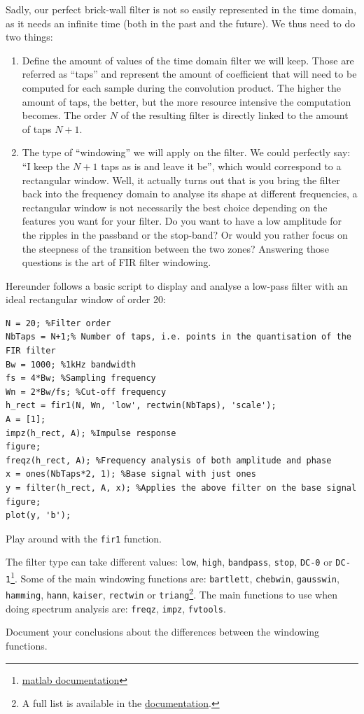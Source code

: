 \documentclass{../template/labo}
\begin{document}
Sadly, our perfect brick-wall filter is not so easily represented in the time domain, as it needs an infinite time (both in the past and the future).
We thus need to do two things:
\begin{enumerate}
  \item Define the amount of values of the time domain filter we will keep. Those are referred as ``taps'' and represent the amount of coefficient that will need to be computed for each sample during the convolution product. The higher the amount of taps, the better, but the more resource intensive the computation becomes.
  The order $N$ of the resulting filter is directly linked to the amount of taps $N+1$.
  \item The type of ``windowing'' we will apply on the filter.
  We could perfectly say: ``I keep the $N+1$ taps as is and leave it be'', which would correspond to a rectangular window.
  Well, it actually turns out that is you bring the filter back into the frequency domain to analyse its shape at different frequencies, a rectangular window is not necessarily the best choice depending on the features you want for your filter.
  Do you want to have a low amplitude for the ripples in the passband or the stop-band? Or would you rather focus on the steepness of the transition between the two zones?
  Answering those questions is the art of FIR filter windowing.
\end{enumerate}


Hereunder follows a basic script to display and analyse a low-pass filter with an ideal rectangular window of order 20:
\begin{verbatim}
N = 20; %Filter order
NbTaps = N+1;% Number of taps, i.e. points in the quantisation of the FIR filter
Bw = 1000; %1kHz bandwidth
fs = 4*Bw; %Sampling frequency
Wn = 2*Bw/fs; %Cut-off frequency
h_rect = fir1(N, Wn, 'low', rectwin(NbTaps), 'scale');
A = [1];
impz(h_rect, A); %Impulse response
figure;
freqz(h_rect, A); %Frequency analysis of both amplitude and phase
x = ones(NbTaps*2, 1); %Base signal with just ones
y = filter(h_rect, A, x); %Applies the above filter on the base signal
figure;
plot(y, 'b');
\end{verbatim}

\begin{leftbar}
Play around with the \texttt{fir1} function.

The filter type can take different values: \texttt{low}, \texttt{high}, \texttt{bandpass}, \texttt{stop}, \texttt{DC-0} or \texttt{DC-1}\footnote{\href{https://nl.mathworks.com/help/signal/ref/fir1.html\#bulla52-ftype}{matlab documentation}}.
Some of the main windowing functions are: \texttt{bartlett}, \texttt{chebwin}, \texttt{gausswin}, \texttt{hamming}, \texttt{hann}, \texttt{kaiser}, \texttt{rectwin} or \texttt{triang}\footnote{A full list is available in the \href{https://nl.mathworks.com/help/signal/referencelist.html?type=function&category=windows&s_tid=CRUX_topnav}{documentation}.}.
The main functions to use when doing spectrum analysis are: \texttt{freqz}, \texttt{impz}, \texttt{fvtools}.

Document your conclusions about the differences between the windowing functions.
\end{leftbar}
\end{document}
